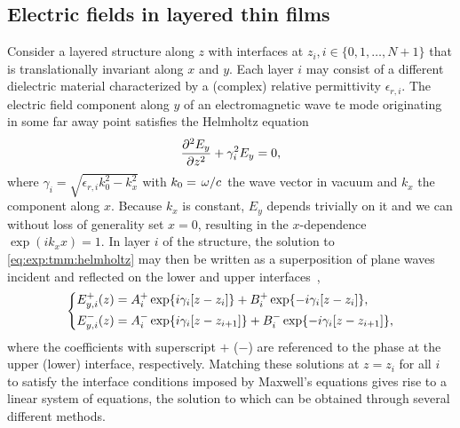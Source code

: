 \subsection{Electric fields in layered thin films}\label{subsec:exp:tmm:theory}
Consider a layered structure along $z$ with interfaces at $z_i, i\in\lbrace 0, 1, \dotsc, N+1\rbrace$ that is translationally invariant along $x$ and $y$.
Each layer $i$ may consist of a different dielectric material characterized by a (complex) relative permittivity $\epsilon_{r,i}$.
The electric field component along $y$ of an electromagnetic wave \gls{te} mode originating in some far away point satisfies the Helmholtz equation
\begin{equation}\label{eq:exp:tmm:helmholtz}
    \pdv[2]{E_y}{z} + \gamma_i^2 E_y = 0,
\end{equation}
where $\gamma_i = \sqrt{\epsilon_{r,i}k_0^2 - k_x^2}$ with $k_0=\flatfrac{\omega}{c}$ the wave vector in vacuum and $k_x$ the component along $x$.
Because $k_x$ is constant, $E_y$ depends trivially on it and we can without loss of generality set $x=0$, resulting in the $x$-dependence $\exp(ik_x x) = 1$.
In layer $i$ of the structure, the solution to \cref{eq:exp:tmm:helmholtz} may then be written as a superposition of plane waves incident and reflected on the lower and upper interfaces~\cite{Langevin2024},
\begin{equation}\label{eq:exp:tmm:fields}
    \begin{dcases}
        E_{y,i}^{+}(z) = A_i^{+}\exp{\ensuremath{i}\gamma_i[z-z_{i}]} + B_i^{+}\exp{-\ensuremath{i}\gamma_i[z-z_{i}]}, \\
        E_{y,i}^{-}(z) = A_i^{-}\exp{\ensuremath{i}\gamma_i[z-z_{i+1}]} + B_i^{-}\exp{-\ensuremath{i}\gamma_i[z-z_{i+1}]},
    \end{dcases}
\end{equation}
where the coefficients with superscript $+$ ($-$) are referenced to the phase at the upper (lower) interface, respectively.
Matching these solutions at $z=z_i$ for all $i$ to satisfy the interface conditions imposed by Maxwell's equations gives rise to a linear system of equations, the solution to which can be obtained through several different methods.

